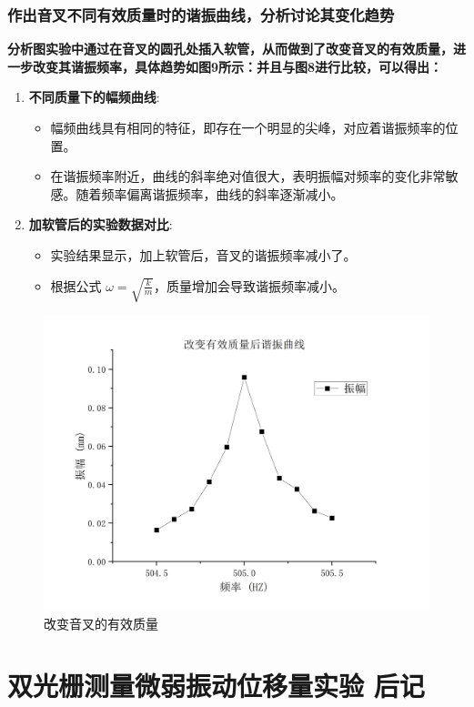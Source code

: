\documentclass[dvipsnames, svgnames,a4paper,11pt]{article}
\begin{document}
	\subsubsection{作出音叉不同有效质量时的谐振曲线，分析讨论其变化趋势}
	
	
	\textbf{分析图实验中通过在音叉的圆孔处插入软管，从而做到了改变音叉的有效质量，进一步改变其谐振频率，具体趋势如图9所示：并且与图8进行比较，可以得出：}
	
	\begin{enumerate}
		\item \textbf{不同质量下的幅频曲线}:
		\begin{itemize}
			\item 幅频曲线具有相同的特征，即存在一个明显的尖峰，对应着谐振频率的位置。
			\item 在谐振频率附近，曲线的斜率绝对值很大，表明振幅对频率的变化非常敏感。随着频率偏离谐振频率，曲线的斜率逐渐减小。
		\end{itemize}
		\item \textbf{加软管后的实验数据对比}:
		\begin{itemize}
			\item 实验结果显示，加上软管后，音叉的谐振频率减小了。
			\item 根据公式 $\omega=\sqrt{\frac{k}{m}}$，质量增加会导致谐振频率减小。
		\end{itemize}
	\end{enumerate}
	\begin{figure}[H]
		\centering
		\includegraphics[width=0.8\linewidth]{images/改变有效质量}
		\caption{改变音叉的有效质量}
		\label{}
	\end{figure}
	\clearpage
	
	\section{双光栅测量微弱振动位移量实验  \quad\heiti  后记}
	
\end{document}
